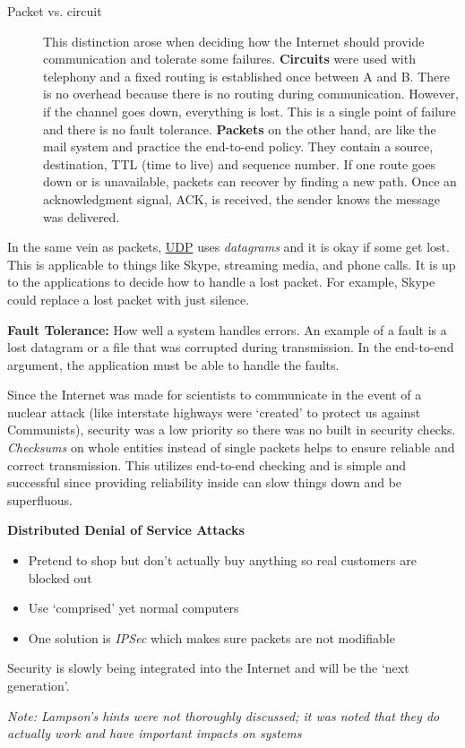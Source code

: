 \documentclass[twoside]{article}
\begin{document}
\begin{description}
\item[Packet vs. circuit] This distinction arose when deciding how the Internet should provide communication and tolerate some failures. \textbf{Circuits} were used with telephony and a fixed routing is established once between A and B. There is no overhead because there is no routing during communication. However, if the channel goes down, everything is lost. This is a single point of failure and there is no fault tolerance. \textbf{Packets} on the other hand, are like the mail system and practice the end-to-end policy. They contain a source, destination, TTL (time to live) and sequence number. If one route goes down or is unavailable, packets can recover by finding a new path. Once an acknowledgment signal, ACK, is received, the sender knows the message was delivered. 
\end{description}
In the same vein as packets, \underline{UDP} uses \emph{datagrams} and it is okay if some get lost. This is applicable to things like Skype, streaming media, and phone calls. It is up to the applications to decide how to handle a lost packet. For example, Skype could replace a lost packet with just silence.

\textbf{Fault Tolerance:} How well a system handles errors. An example of a fault is a lost datagram or a file that was corrupted during transmission. In the end-to-end argument, the application must be able to handle the faults.


Since the Internet was made for scientists to communicate in the event of a nuclear attack (like interstate highways were `created' to protect us against Communists), security was a low priority so there was no built in security checks. \emph{Checksums} on whole entities instead of single packets helps to ensure reliable and correct transmission. This utilizes end-to-end checking and is simple and successful since providing reliability inside can slow things down and be superfluous.

{\normalsize \textbf{Distributed Denial of Service Attacks}}
\begin{itemize}
\item Pretend to shop but don't actually buy anything so real customers are blocked out
\item Use `comprised' yet normal computers
\item One solution is \emph{IPSec} which makes sure packets are not modifiable 
\end{itemize}

Security is slowly being integrated into the Internet and will be the `next generation'.

\emph{Note: Lampson's hints were not thoroughly discussed; it was noted that they do actually work and have important impacts on systems} 
\end{document}
